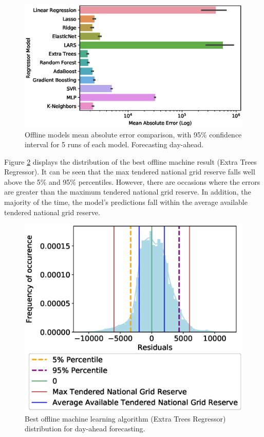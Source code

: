 \begin{figure}
	\centering
	\includegraphics[width=0.65\columnwidth]{Chapter5/figures/market-forecasting/results/offline_model_mae.eps}
	\caption{Offline models mean absolute error comparison, with 95\% confidence interval for 5 runs of each model. Forecasting day-ahead.}
	\label{fig:beis_elecsim_historic_comparison}
\end{figure}



Figure \ref{fig:best_offline_learning_day_distribution} displays the distribution of the best offline machine result (Extra Trees Regressor). It can be seen that the max tendered national grid reserve falls well above the 5\% and 95\% percentiles. However, there are occasions where the errors are greater than the maximum tendered national grid reserve. In addition, the majority of the time, the model's predictions fall within the average available tendered national grid reserve.

\begin{figure}
	\centering
	\includegraphics[width=0.65\columnwidth]{Chapter5/figures/market-forecasting/results/ExtraTreesRegressor_distribution_plot.eps}
	\caption{Best offline machine learning algorithm (Extra Trees Regressor) distribution for day-ahead forecasting.}
	\label{fig:best_offline_learning_day_distribution}
\end{figure}


